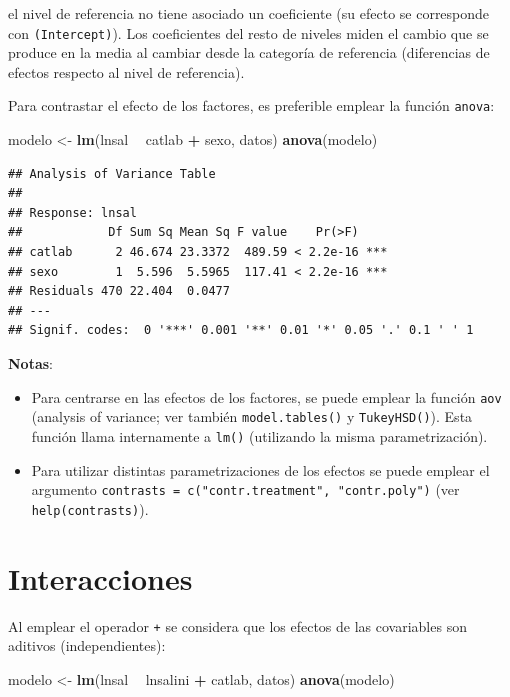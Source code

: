 \documentclass[]{book}
\newenvironment{Shaded}{\begin{snugshade}}{\end{snugshade}}
\newcommand{\KeywordTok}[1]{\textcolor[rgb]{0.13,0.29,0.53}{\textbf{#1}}}
\newcommand{\StringTok}[1]{\textcolor[rgb]{0.31,0.60,0.02}{#1}}
\newcommand{\OperatorTok}[1]{\textcolor[rgb]{0.81,0.36,0.00}{\textbf{#1}}}
\newcommand{\NormalTok}[1]{#1}
\begin{document}
el nivel de referencia no tiene asociado un coeficiente (su efecto se
corresponde con \texttt{(Intercept)}). Los coeficientes del resto de
niveles miden el cambio que se produce en la media al cambiar desde la
categoría de referencia (diferencias de efectos respecto al nivel de
referencia).

Para contrastar el efecto de los factores, es preferible emplear la
función \texttt{anova}:

\begin{Shaded}
\begin{Highlighting}[]
\NormalTok{modelo <-}\StringTok{ }\KeywordTok{lm}\NormalTok{(lnsal }\OperatorTok{~}\StringTok{ }\NormalTok{catlab }\OperatorTok{+}\StringTok{ }\NormalTok{sexo, datos)}
\KeywordTok{anova}\NormalTok{(modelo)}
\end{Highlighting}
\end{Shaded}

\begin{verbatim}
## Analysis of Variance Table
## 
## Response: lnsal
##            Df Sum Sq Mean Sq F value    Pr(>F)    
## catlab      2 46.674 23.3372  489.59 < 2.2e-16 ***
## sexo        1  5.596  5.5965  117.41 < 2.2e-16 ***
## Residuals 470 22.404  0.0477                      
## ---
## Signif. codes:  0 '***' 0.001 '**' 0.01 '*' 0.05 '.' 0.1 ' ' 1
\end{verbatim}

\textbf{Notas}:

\begin{itemize}
\item
  Para centrarse en las efectos de los factores, se puede emplear la
  función \texttt{aov} (analysis of variance; ver también
  \texttt{model.tables()} y \texttt{TukeyHSD()}). Esta función llama
  internamente a \texttt{lm()} (utilizando la misma parametrización).
\item
  Para utilizar distintas parametrizaciones de los efectos se puede
  emplear el argumento
  \texttt{contrasts\ =\ c("contr.treatment",\ "contr.poly")} (ver
  \texttt{help(contrasts)}).
\end{itemize}

\section{Interacciones}\label{interacciones}

Al emplear el operador \texttt{+} se considera que los efectos de las
covariables son aditivos (independientes):

\begin{Shaded}
\begin{Highlighting}[]
\NormalTok{modelo <-}\StringTok{ }\KeywordTok{lm}\NormalTok{(lnsal }\OperatorTok{~}\StringTok{ }\NormalTok{lnsalini }\OperatorTok{+}\StringTok{ }\NormalTok{catlab, datos)}
\KeywordTok{anova}\NormalTok{(modelo)}
\end{Highlighting}
\end{Shaded}
\end{document}
